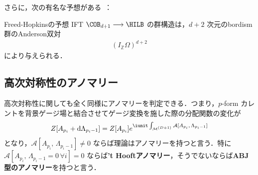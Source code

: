 \documentclass[TQFT_main]{subfiles}
\begin{document}
さらに，次の有名な予想がある~\cite{FreedHopkins_2021}：

\begin{myconj}[label=conj:Freed-Hopkins]{Freed-Hopkinsの予想}
    IFT $\COB_{d+1} \lto \HILB$ の群構造は，$d+2$ 次元のbordism群のAnderson双対
    \begin{align}
        (I_{\mathbb{Z}} \Omega)^{d+2}
    \end{align}
    により与えられる．
\end{myconj}


\subsection{高次対称性のアノマリー}

高次対称性に関しても全く同様にアノマリーを判定できる．つまり，$p$-form カレントを背景ゲージ場と結合させてゲージ変換を施した際の分配関数の変化が
\begin{align}
    Z[A_{p_i} + \dd{\Lambda_{p_i-1}}] = Z[A_{p_i}] e^{\iunit \int_{\mfdcal{M}{D+1}} \mathcal{A}[A_{p_i},\, \Lambda_{p_i-1}]}
\end{align}
となり，$\mathcal{A}[A_{p_i},\, \Lambda_{p_i-1}] \neq 0$ ならば理論はアノマリーを持つと言う．特に $\mathcal{A}[A_{p_i},\, \Lambda_{p_i-1} = 0\, \forall i] = 0$ ならば\textbf{'t Hooftアノマリー}，そうでないならば\textbf{ABJ型のアノマリー}を持つと言う．
\end{document}

